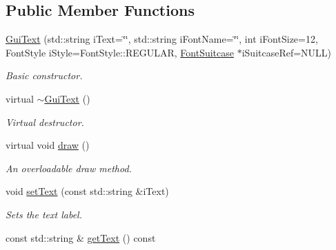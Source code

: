 \subsection*{Public Member Functions}
\begin{DoxyCompactItemize}
\item 
\hypertarget{class_gui_text_a88cfe951bc47d61d292e13f9829bf1c2}{\hyperlink{class_gui_text_a88cfe951bc47d61d292e13f9829bf1c2}{Gui\-Text} (std\-::string i\-Text=\char`\"{}\char`\"{}, std\-::string i\-Font\-Name=\char`\"{}\char`\"{}, int i\-Font\-Size=12, Font\-Style i\-Style=Font\-Style\-::\-R\-E\-G\-U\-L\-A\-R, \hyperlink{class_font_suitcase}{Font\-Suitcase} $\ast$i\-Suitcase\-Ref=N\-U\-L\-L)}\label{class_gui_text_a88cfe951bc47d61d292e13f9829bf1c2}

\begin{DoxyCompactList}\small\item\em Basic constructor. \end{DoxyCompactList}\item 
\hypertarget{class_gui_text_a4fbdd1903c10906ac4b4ab5104d7599b}{virtual \hyperlink{class_gui_text_a4fbdd1903c10906ac4b4ab5104d7599b}{$\sim$\-Gui\-Text} ()}\label{class_gui_text_a4fbdd1903c10906ac4b4ab5104d7599b}

\begin{DoxyCompactList}\small\item\em Virtual destructor. \end{DoxyCompactList}\item 
\hypertarget{class_gui_text_a1bdcdc88b3b05523f54a5dd96146bfd0}{virtual void \hyperlink{class_gui_text_a1bdcdc88b3b05523f54a5dd96146bfd0}{draw} ()}\label{class_gui_text_a1bdcdc88b3b05523f54a5dd96146bfd0}

\begin{DoxyCompactList}\small\item\em An overloadable draw method. \end{DoxyCompactList}\item 
\hypertarget{class_gui_text_aa195f211e62bd4fcaa06a6ef129d4abc}{void \hyperlink{class_gui_text_aa195f211e62bd4fcaa06a6ef129d4abc}{set\-Text} (const std\-::string \&i\-Text)}\label{class_gui_text_aa195f211e62bd4fcaa06a6ef129d4abc}

\begin{DoxyCompactList}\small\item\em Sets the text label. \end{DoxyCompactList}\item 
\hypertarget{class_gui_text_a10261a9bbce64ec76b1b565f805df162}{const std\-::string \& \hyperlink{class_gui_text_a10261a9bbce64ec76b1b565f805df162}{get\-Text} () const }\label{class_gui_text_a10261a9bbce64ec76b1b565f805df162}


\end{DoxyCompactItemize}
